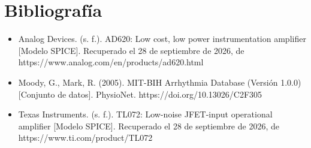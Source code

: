 \section{Bibliografía}

\begin{itemize}
    \item Analog Devices. (s. f.). AD620: Low cost, low power instrumentation amplifier [Modelo SPICE]. Recuperado el 28 de septiembre de 2026, de https://www.analog.com/en/products/ad620.html
    \item Moody, G., Mark, R. (2005). MIT-BIH Arrhythmia Database (Versión 1.0.0) [Conjunto de datos]. PhysioNet. https://doi.org/10.13026/C2F305
    \item Texas Instruments. (s. f.). TL072: Low-noise JFET-input operational amplifier [Modelo SPICE]. Recuperado el 28 de septiembre de 2026, de https://www.ti.com/product/TL072
\end{itemize}
